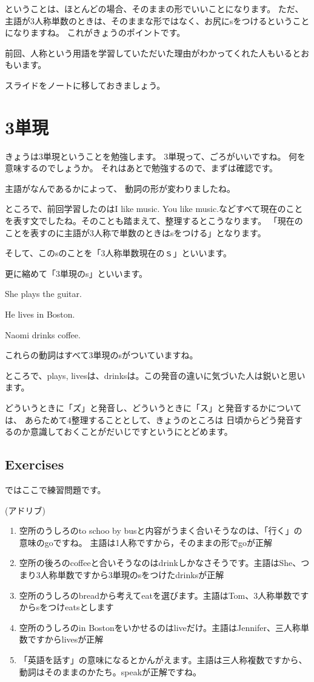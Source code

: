 \documentclass[book,jafontscale=0.9247]{jlreq}
\let\textipa\relax
\begin{document}
ということは、ほとんどの場合、そのままの形でいいことになります。
ただ、主語が3人称単数のときは、そのままな形ではなく、お尻にsをつけるということになりますね。
これがきょうのポイントです。


前回、人称という用語を学習していただいた理由がわかってくれた人もいるとおもいます。

スライドをノートに移しておきましょう。
\newpage
 \section{3単現}
きょうは3単現ということを勉強します。
3単現って、ごろがいいですね。
何を意味するのでしょうか。
それはあとで勉強するので、まずは確認です。

主語がなんであるかによって、
動詞の形が変わりましたね。

ところで、前回学習したのはI like music. You like music.などすべて現在のことを表す文でしたね。そのことも踏まえて、整理するとこうなります。
「現在のことを表すのに主語が3人称で単数のときはsをつける」となります。

そして、このsのことを「3人称単数現在のｓ」といいます。

更に縮めて「3単現のs」といいます。

She plays the guitar.

He lives in Boston.

Naomi drinks coffee.

これらの動詞はすべて3単現のsがついていますね。

ところで、plays, livesは\textipa{/z/}、drinksは\textipa{/s/}。この発音の違いに気づいた人は鋭いと思います。

どういうときに「ズ」と発音し、どういうときに「ス」と発音するかについては、
あらためて4整理することとして、きょうのところは
日頃からどう発音するのか意識しておくことがだいじですというにとどめます。
\subsection{Exercises}


ではここで練習問題です。

(アドリブ)


\begin{enumerate}
 \item 空所のうしろのto schoo by busと内容がうまく合いそうなのは、「行く」の意味のgoですね。
主語は1人称ですから，そのままの形でgoが正解
 \item 空所の後ろのcoffeeと合いそうなのはdrinkしかなさそうです。主語はShe、つまり3人称単数ですから3単現のsをつけたdrinksが正解
 \item 空所のうしろのbreadから考えてeatを選びます。主語はTom、3人称単数ですからsをつけeatsとします
 \item 空所のうしろのin Bostonをいかせるのはliveだけ。主語はJennifer、三人称単数ですからlivesが正解
 \item 「英語を話す」の意味になるとかんがえます。主語は三人称複数ですから、動詞はそのままのかたち。speakが正解ですね。
\end{enumerate}
\end{document}
